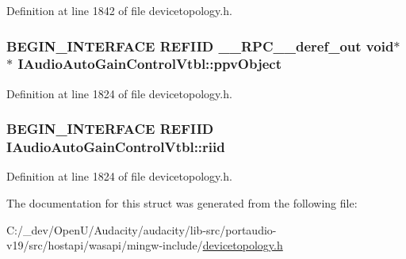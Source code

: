 Definition at line 1842 of file devicetopology.\+h.

\subsubsection[{\texorpdfstring{ppv\+Object}{ppvObject}}]{\setlength{\rightskip}{0pt plus 5cm}B\+E\+G\+I\+N\+\_\+\+I\+N\+T\+E\+R\+F\+A\+CE {\bf R\+E\+F\+I\+ID} {\bf \+\_\+\+\_\+\+R\+P\+C\+\_\+\+\_\+deref\+\_\+out} {\bf void}$\ast$$\ast$ I\+Audio\+Auto\+Gain\+Control\+Vtbl\+::ppv\+Object}\hypertarget{struct_i_audio_auto_gain_control_vtbl_a186510ffd3581e6b8a7bd0d40422d1a4}{}\label{struct_i_audio_auto_gain_control_vtbl_a186510ffd3581e6b8a7bd0d40422d1a4}


Definition at line 1824 of file devicetopology.\+h.

\subsubsection[{\texorpdfstring{riid}{riid}}]{\setlength{\rightskip}{0pt plus 5cm}B\+E\+G\+I\+N\+\_\+\+I\+N\+T\+E\+R\+F\+A\+CE {\bf R\+E\+F\+I\+ID} I\+Audio\+Auto\+Gain\+Control\+Vtbl\+::riid}\hypertarget{struct_i_audio_auto_gain_control_vtbl_a97d8367a596dc1604ad10423612fe176}{}\label{struct_i_audio_auto_gain_control_vtbl_a97d8367a596dc1604ad10423612fe176}


Definition at line 1824 of file devicetopology.\+h.



The documentation for this struct was generated from the following file\+:\begin{DoxyCompactItemize}
\item 
C\+:/\+\_\+dev/\+Open\+U/\+Audacity/audacity/lib-\/src/portaudio-\/v19/src/hostapi/wasapi/mingw-\/include/\hyperlink{devicetopology_8h}{devicetopology.\+h}\end{DoxyCompactItemize}
